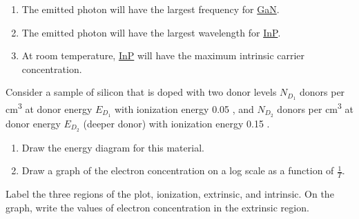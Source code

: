 \documentclass[fleqn, a4paper, 11pt, oneside]{amsart}
\theoremstyle{definition}
\theoremstyle{theorem}
\renewcommand{\emph}{\uline}
\begin{document}
\begin{solution}
	\begin{enumerate}
		\item The emitted photon will have the largest frequency for \emph{GaN}.
		\item The emitted photon will have the largest wavelength for \emph{InP}.
		\item At room temperature, \emph{InP} will have the maximum intrinsic carrier concentration.
	\end{enumerate}
\end{solution}

\begin{question}
	Consider a sample of silicon that is doped with two donor levels $N_{D_1}$ donors per \si{\centi\metre\cubed} at donor energy $E_{D_1}$ with ionization energy 0.05 \electronvolt, and $N_{D_2}$ donors per \si{\centi\metre\cubed} at donor energy $E_{D_2}$ (deeper donor) with ionization energy 0.15 \electronvolt.
	\begin{enumerate}
		\item Draw the energy diagram for this material.
		\item Draw a graph of the electron concentration on a log scale as a function of $\frac{1}{T}$.
	\end{enumerate}
	Label the three regions of the plot, ionization, extrinsic, and intrinsic.
	On the graph, write the values of electron concentration in the extrinsic region.
\end{question}
\end{document}
